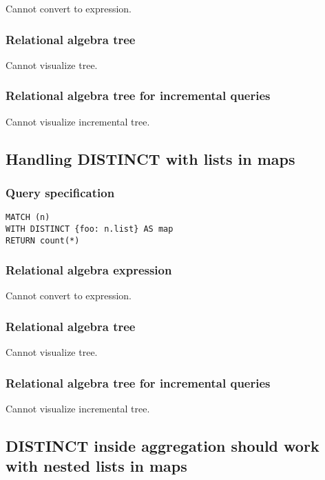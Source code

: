 Cannot convert to expression.

\subsubsection*{Relational algebra tree}

Cannot visualize tree.

\subsubsection*{Relational algebra tree for incremental queries}

Cannot visualize incremental tree.

\subsection{Handling DISTINCT with lists in maps}

\subsubsection*{Query specification}

\begin{lstlisting}
MATCH (n)
WITH DISTINCT {foo: n.list} AS map
RETURN count(*)
\end{lstlisting}

\subsubsection*{Relational algebra expression}

Cannot convert to expression.

\subsubsection*{Relational algebra tree}

Cannot visualize tree.

\subsubsection*{Relational algebra tree for incremental queries}

Cannot visualize incremental tree.

\subsection{DISTINCT inside aggregation should work with nested lists in maps}

